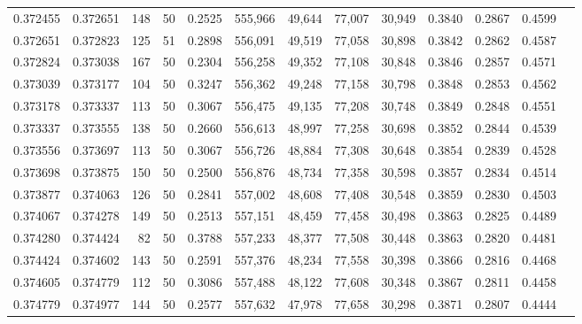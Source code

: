 \begin{tabular}{rrrrrrrrrrrrr}
0.372455 & 0.372651 &   148 &  50 &                                     0.2525 & 555,966 &  49,644 &  77,007 &  30,949 & 0.3840 & 0.2867 & 0.4599 \\
0.372651 & 0.372823 &   125 &  51 &                                     0.2898 & 556,091 &  49,519 &  77,058 &  30,898 & 0.3842 & 0.2862 & 0.4587 \\
0.372824 & 0.373038 &   167 &  50 &                                     0.2304 & 556,258 &  49,352 &  77,108 &  30,848 & 0.3846 & 0.2857 & 0.4571 \\
0.373039 & 0.373177 &   104 &  50 &                                     0.3247 & 556,362 &  49,248 &  77,158 &  30,798 & 0.3848 & 0.2853 & 0.4562 \\
0.373178 & 0.373337 &   113 &  50 &                                     0.3067 & 556,475 &  49,135 &  77,208 &  30,748 & 0.3849 & 0.2848 & 0.4551 \\
0.373337 & 0.373555 &   138 &  50 &                                     0.2660 & 556,613 &  48,997 &  77,258 &  30,698 & 0.3852 & 0.2844 & 0.4539 \\
0.373556 & 0.373697 &   113 &  50 &                                     0.3067 & 556,726 &  48,884 &  77,308 &  30,648 & 0.3854 & 0.2839 & 0.4528 \\
0.373698 & 0.373875 &   150 &  50 &                                     0.2500 & 556,876 &  48,734 &  77,358 &  30,598 & 0.3857 & 0.2834 & 0.4514 \\
0.373877 & 0.374063 &   126 &  50 &                                     0.2841 & 557,002 &  48,608 &  77,408 &  30,548 & 0.3859 & 0.2830 & 0.4503 \\
0.374067 & 0.374278 &   149 &  50 &                                     0.2513 & 557,151 &  48,459 &  77,458 &  30,498 & 0.3863 & 0.2825 & 0.4489 \\
0.374280 & 0.374424 &    82 &  50 &                                     0.3788 & 557,233 &  48,377 &  77,508 &  30,448 & 0.3863 & 0.2820 & 0.4481 \\
0.374424 & 0.374602 &   143 &  50 &                                     0.2591 & 557,376 &  48,234 &  77,558 &  30,398 & 0.3866 & 0.2816 & 0.4468 \\
0.374605 & 0.374779 &   112 &  50 &                                     0.3086 & 557,488 &  48,122 &  77,608 &  30,348 & 0.3867 & 0.2811 & 0.4458 \\
0.374779 & 0.374977 &   144 &  50 &                                     0.2577 & 557,632 &  47,978 &  77,658 &  30,298 & 0.3871 & 0.2807 & 0.4444 \\

\end{tabular}
